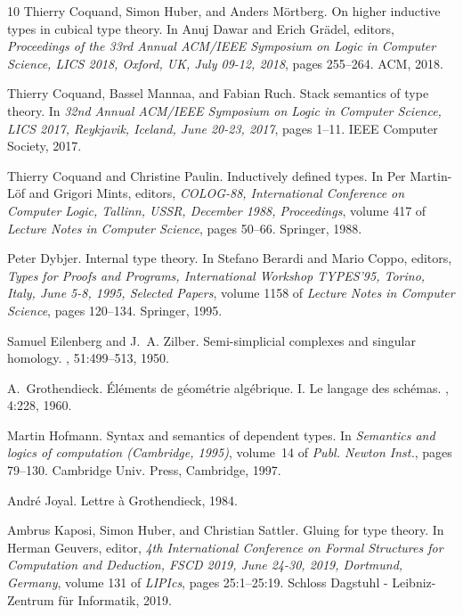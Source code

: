 \documentclass[10pt,a4paper,draft]{article}
\renewcommand{\~}{\widetilde}
\theoremstyle{definition}
\theoremstyle{remark} %
\begin{document}
\begin{thebibliography}{10}
Thierry Coquand, Simon Huber, and Anders M\"{o}rtberg.
\newblock On higher inductive types in cubical type theory.
\newblock In Anuj Dawar and Erich Gr\"{a}del, editors, {\em Proceedings of the
  33rd Annual {ACM/IEEE} Symposium on Logic in Computer Science, {LICS} 2018,
  Oxford, UK, July 09-12, 2018}, pages 255--264. {ACM}, 2018.

Thierry Coquand, Bassel Mannaa, and Fabian Ruch.
\newblock Stack semantics of type theory.
\newblock In {\em 32nd Annual {ACM/IEEE} Symposium on Logic in Computer
  Science, {LICS} 2017, Reykjavik, Iceland, June 20-23, 2017}, pages 1--11.
  {IEEE} Computer Society, 2017.

Thierry Coquand and Christine Paulin.
\newblock Inductively defined types.
\newblock In Per Martin{-}L\"{o}f and Grigori Mints, editors, {\em COLOG-88,
  International Conference on Computer Logic, Tallinn, USSR, December 1988,
  Proceedings}, volume 417 of {\em Lecture Notes in Computer Science}, pages
  50--66. Springer, 1988.

Peter Dybjer.
\newblock Internal type theory.
\newblock In Stefano Berardi and Mario Coppo, editors, {\em Types for Proofs
  and Programs, International Workshop TYPES'95, Torino, Italy, June 5-8, 1995,
  Selected Papers}, volume 1158 of {\em Lecture Notes in Computer Science},
  pages 120--134. Springer, 1995.

Samuel Eilenberg and J.~A. Zilber.
\newblock Semi-simplicial complexes and singular homology.
, 51:499--513, 1950.

A.~Grothendieck.
\newblock \'{E}l\'{e}ments de g\'{e}om\'{e}trie alg\'{e}brique. {I}. {L}e
  langage des sch\'{e}mas.
, 4:228, 1960.

Martin Hofmann.
\newblock Syntax and semantics of dependent types.
\newblock In {\em Semantics and logics of computation ({C}ambridge, 1995)},
  volume~14 of {\em Publ. Newton Inst.}, pages 79--130. Cambridge Univ. Press,
  Cambridge, 1997.

Andr{\'{e}} Joyal.
\newblock Lettre {\`{a}} {Grothendieck}, 1984.

Ambrus Kaposi, Simon Huber, and Christian Sattler.
\newblock Gluing for type theory.
\newblock In Herman Geuvers, editor, {\em 4th International Conference on
  Formal Structures for Computation and Deduction, {FSCD} 2019, June 24-30,
  2019, Dortmund, Germany}, volume 131 of {\em LIPIcs}, pages 25:1--25:19.
  Schloss Dagstuhl - Leibniz-Zentrum f\"{u}r Informatik, 2019.


\end{thebibliography}
\end{document}
